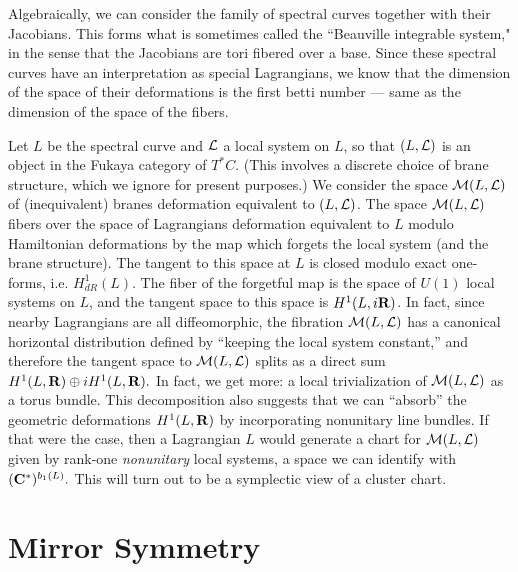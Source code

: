 Algebraically, we can consider the family of spectral curves together with their
Jacobians.  This forms what is sometimes called the ``Beauville integrable system,"
in the sense that the Jacobians are tori fibered over a base.  Since these
spectral curves have an interpretation as special Lagrangians, we know that the
dimension of the space of their deformations is the first betti number --- same as the
dimension of the space of the fibers.

Let $L$ be the spectral curve and $\mathcal{L}$ a local system on $L$, so
that $(L,\mathcal{L})$ is an object in the Fukaya category of $T^*C.$
(This involves a discrete choice of brane structure, which we ignore for present purposes.)
We consider the space $\mathcal{M}(L,\mathcal{L})$ of (inequivalent) branes deformation equivalent to $(L,\mathcal{L})$.
The space $\mathcal{M}(L,\mathcal{L})$
fibers over the space of Lagrangians deformation equivalent to $L$
modulo Hamiltonian deformations by the map which forgets the local system (and the brane
structure).  The tangent to this space at $L$ is closed modulo
exact one-forms, i.e. $H_{dR}^1(L).$
The fiber of the forgetful map is the space of $U(1)$ local systems on $L$, and the
tangent space to this space is $H^1(L,i\mathbf{R})$.
In fact, since nearby Lagrangians are all diffeomorphic, the fibration $\mathcal{M}(L,\mathcal{L})$ has
a canonical horizontal distribution defined by ``keeping the local system constant,'' and
therefore the tangent space to $\mathcal{M}(L,\mathcal{L})$ splits as a direct sum
$H^1(L,\mathbf{R})\oplus iH^1(L,\mathbf{R}).$
In fact, we get more:  a local trivialization of $\mathcal{M}(L,\mathcal{L})$ as a torus bundle.
This decomposition also suggests that we can ``absorb'' the geometric deformations
$H^1(L,\mathbf{R})$ by incorporating nonunitary line bundles.  If that were the case, then
a Lagrangian $L$ would generate a chart for $\mathcal{M}(L,\mathcal{L})$ given by rank-one \emph{nonunitary}
local systems, a space we can identify with $(\mathbf{C}^*)^{b_1(L)}.$  This will
turn out to be a symplectic
view of a cluster chart.






%

\section{Mirror Symmetry}

